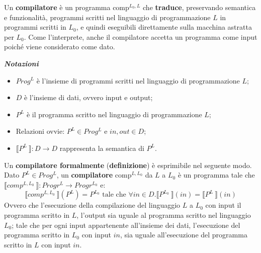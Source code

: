 \documentclass[a4paper]{article}
\newcommand{\exec}[1]{\llbracket #1\:\rrbracket}
\begin{document}
	Un \textcolor{Red3}{\textbf{compilatore}} è un programma $\mathrm{comp}^{L_{0}, L}$ che \textbf{traduce}, preservando semantica e funzionalità, programmi scritti nel linguaggio di programmazione $L$ in programmi scritti in $L_{0}$, e quindi eseguibili direttamente sulla macchina astratta per $L_{0}$.
	Come l'interprete, anche il compilatore accetta un programma come input poiché viene considerato come dato.
	\begin{center}
		\textcolor{Red3}{\textbf{\emph{Notazioni}}}
	\end{center}
	\begin{itemize}
		\item $Prog^{L}$ è l'insieme di programmi scritti nel linguaggio di programmazione $L$;
		\item $D$ è l'insieme di dati, ovvero input e output;
		\item $P^{L}$ è il programma scritto nel linguaggio di programmazione $L$;
		\item Relazioni ovvie: $P^{L} \in Prog^{L}$ e $in, out \in D$;
		\item $\exec{P^{L}}: D \longrightarrow D$ rappresenta la semantica di $P^{L}$.
	\end{itemize}
	Un \textcolor{Red3}{\textbf{compilatore formalmente}} (\textbf{definizione}) è esprimibile nel seguente modo.\newline
	Dato $P^{L} \in Prog^{L}$, un \textbf{compilatore} $\mathrm{comp}^{L, L_{0}}$ da $L$ a $L_{0}$ è un programma tale che $\exec{comp^{L, L_{0}}}: Progr^{L} \longrightarrow Progr^{L_{0}}$ e:
	\begin{equation*}
		\exec{comp^{L, L_{0}}}\left(P^{L}\right) = P^{L_{0}} \text{ tale che } \forall in \in D. \exec{P^{L_{0}}}\left(in\right) = \exec{P^{L}}\left(in\right)
	\end{equation*}
	Ovvero che l'esecuzione della compilazione del linguaggio $L$ a $L_{0}$ con input il programma scritto in $L$, l'output sia uguale al programma scritto nel linguaggio $L_{0}$; tale che per ogni input appartenente all'insieme dei dati, l'esecuzione del programma scritto in $L_{0}$ con input $in$, sia uguale all'esecuzione del programma scritto in $L$ con input $in$.\newline
\end{document}
